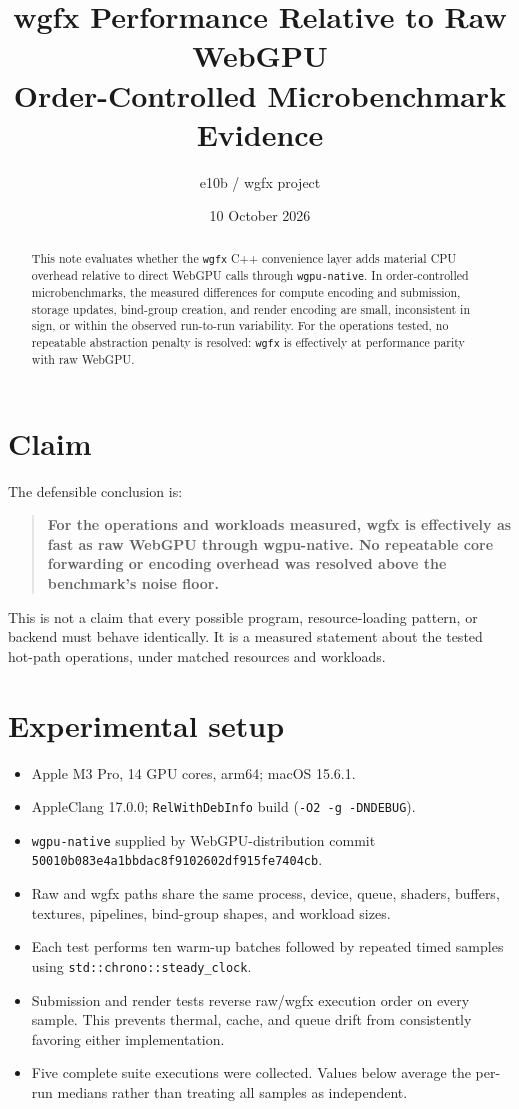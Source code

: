 \documentclass[11pt]{article}
\title{\textbf{wgfx Performance Relative to Raw WebGPU}\\
\large Order-Controlled Microbenchmark Evidence}
\author{e10b / wgfx project}
\date{10 October 2026}
\begin{document}
\maketitle

\begin{abstract}
This note evaluates whether the \texttt{wgfx} C++ convenience layer adds
material CPU overhead relative to direct WebGPU calls through
\texttt{wgpu-native}. In order-controlled microbenchmarks, the measured
differences for compute encoding and submission, storage updates, bind-group
creation, and render encoding are small, inconsistent in sign, or within the
observed run-to-run variability. For the operations tested, no repeatable
abstraction penalty is resolved: \texttt{wgfx} is effectively at performance
parity with raw WebGPU.
\end{abstract}

\section{Claim}

The defensible conclusion is:

\begin{quote}
\textbf{For the operations and workloads measured, wgfx is effectively as fast
as raw WebGPU through wgpu-native. No repeatable core forwarding or encoding
overhead was resolved above the benchmark's noise floor.}
\end{quote}

This is not a claim that every possible program, resource-loading pattern, or
backend must behave identically. It is a measured statement about the tested
hot-path operations, under matched resources and workloads.

\section{Experimental setup}

\begin{itemize}
  \item Apple M3 Pro, 14 GPU cores, arm64; macOS 15.6.1.
  \item AppleClang 17.0.0; \texttt{RelWithDebInfo} build
        (\texttt{-O2 -g -DNDEBUG}).
  \item \texttt{wgpu-native} supplied by WebGPU-distribution commit
        \texttt{50010b083e4a1bbdac8f9102602df915fe7404cb}.
  \item Raw and wgfx paths share the same process, device, queue, shaders,
        buffers, textures, pipelines, bind-group shapes, and workload sizes.
  \item Each test performs ten warm-up batches followed by repeated timed
        samples using \texttt{std::chrono::steady\_clock}.
  \item Submission and render tests reverse raw/wgfx execution order on every
        sample. This prevents thermal, cache, and queue drift from consistently
        favoring either implementation.
  \item Five complete suite executions were collected. Values below average
        the per-run medians rather than treating all samples as independent.
\end{itemize}
\end{document}
